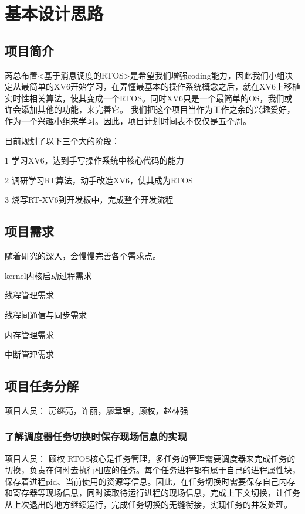 

\chapter{基本设计思路}
\section{项目简介}
芮总布置<基于消息调度的RTOS>是希望我们增强coding能力，因此我们小组决定从最简单的XV6开始学习，在弄懂最基本的操作系统概念之后，就在XV6上移植实时性相关算法，使其变成一个RTOS。同时XV6只是一个最简单的OS，我们或许会添加其他的功能，来完善它。{\color{red} 我们把这个项目当作为工作之余的兴趣爱好，作为一个兴趣小组来学习。因此，项目计划时间表不仅仅是五个周。}

目前规划了以下三个大的阶段：

1 学习XV6，达到手写操作系统中核心代码的能力

2 调研学习RT算法，动手改造XV6，使其成为RTOS

3 烧写RT-XV6到开发板中，完成整个开发流程


\section{项目需求}
随着研究的深入，会慢慢完善各个需求点。

kernel内核启动过程需求

线程管理需求

线程间通信与同步需求 

内存管理需求

中断管理需求
\section{项目任务分解}
项目人员： 房继亮，许丽，廖章锦，顾权，赵林强
\subsection{了解调度器任务切换时保存现场信息的实现}
项目人员： 顾权
RTOS核心是任务管理，多任务的管理需要调度器来完成任务的切换，负责在何时去执行相应的任务。每个任务进程都有属于自己的进程属性块，保存着进程pid、当前使用的资源等信息。因此，在任务切换时需要保存自己内存和寄存器等现场信息，同时读取待运行进程的现场信息，完成上下文切换，让任务从上次退出的地方继续运行，完成任务切换的无缝衔接，实现任务的并发处理。

